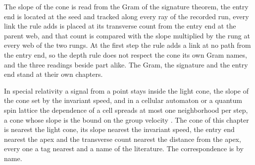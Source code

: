 \chdeps{}{}
The slope of the cone is read from the Gram of the signature theorem, the entry end is located at the seed and tracked along every ray of the recorded run, every link the rule adds is placed at its transverse count from the entry end at the parent web, and that count is compared with the slope multiplied by the rung at every web of the two rungs. At the first step the rule adds a link at no path from the entry end, so the depth rule does not respect the cone its own Gram names, and the three readings beside part alike. The Gram, the signature and the entry end stand at their own chapters.
\begin{chbridge}
In special relativity a signal from a point stays inside the light cone, the slope of the cone set by the invariant speed, and in a cellular automaton or a quantum spin lattice the dependence of a cell spreads at most one neighborhood per step, a cone whose slope is the bound on the group velocity \cite{Minkowski1908,LiebRobinson1972}. The cone of this chapter is nearest the light cone, its slope nearest the invariant speed, the entry end nearest the apex and the transverse count nearest the distance from the apex, every one a tag nearest and a name of the literature. The correspondence is by name.
\end{chbridge}
